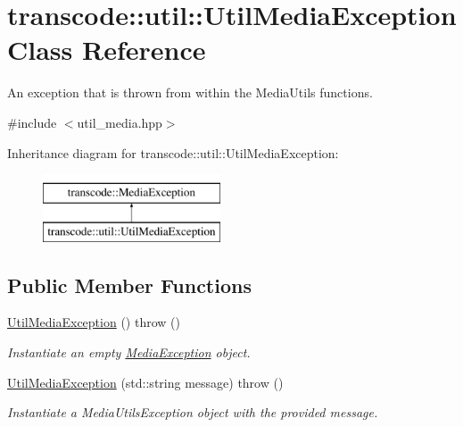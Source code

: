 \hypertarget{classtranscode_1_1util_1_1UtilMediaException}{
\section{transcode::util::UtilMediaException Class Reference}
\label{classtranscode_1_1util_1_1UtilMediaException}
}


An exception that is thrown from within the MediaUtils functions.  




{\ttfamily \#include $<$util\_\-media.hpp$>$}

Inheritance diagram for transcode::util::UtilMediaException:\begin{figure}[H]
\begin{center}
\leavevmode
\includegraphics[height=2.000000cm]{classtranscode_1_1util_1_1UtilMediaException}
\end{center}
\end{figure}
\subsection*{Public Member Functions}
\begin{DoxyCompactItemize}
\item 
\hyperlink{classtranscode_1_1util_1_1UtilMediaException_a36ad85f029238d06a530913ead5f67d6}{UtilMediaException} ()  throw ()
\begin{DoxyCompactList}\small\item\em Instantiate an empty \hyperlink{classtranscode_1_1MediaException}{MediaException} object. \item\end{DoxyCompactList}\item 
\hyperlink{classtranscode_1_1util_1_1UtilMediaException_a516da50b349d9850d27054fd4f29db4b}{UtilMediaException} (std::string message)  throw ()
\begin{DoxyCompactList}\small\item\em Instantiate a MediaUtilsException object with the provided message. \item\end{DoxyCompactList}\end{DoxyCompactItemize}


